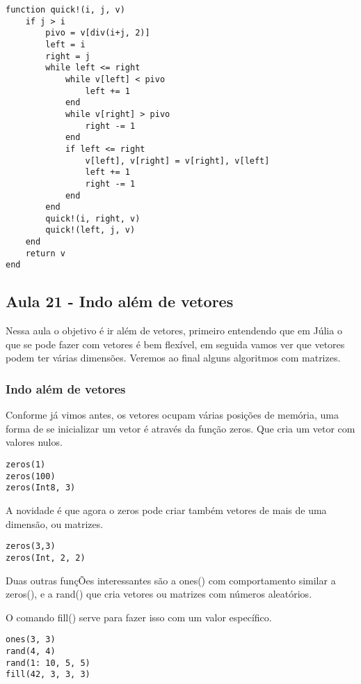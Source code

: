 \documentclass[a4paper]{article}
\begin{document}
\lstset{language=ein-julia,label= ,caption= ,captionpos=b,numbers=none}
\begin{lstlisting}
function quick!(i, j, v)
    if j > i
        pivo = v[div(i+j, 2)]
        left = i
        right = j
        while left <= right
            while v[left] < pivo
                left += 1
            end
            while v[right] > pivo
                right -= 1
            end
            if left <= right
                v[left], v[right] = v[right], v[left]
                left += 1
                right -= 1
            end
        end
        quick!(i, right, v)
        quick!(left, j, v)
    end
    return v
end
\end{lstlisting}
\newpage
\subsection{Aula 21 - Indo além de vetores}
\label{sec:org61260c0}
Nessa aula o objetivo é ir além de vetores, primeiro entendendo que em
Júlia o que se pode fazer com vetores é bem flexível, em seguida vamos
ver que vetores podem ter várias dimensões. Veremos ao final alguns algoritmos
com matrizes.

\subsubsection{Indo além de vetores}
\label{sec:orgedfa311}
Conforme já vimos antes, os vetores ocupam várias posições de
memória, uma forma de se inicializar um vetor é através da função
zeros. Que cria um vetor com valores nulos.

\lstset{language=ein-julia,label= ,caption= ,captionpos=b,numbers=none}
\begin{lstlisting}
zeros(1)
zeros(100)
zeros(Int8, 3)
\end{lstlisting}

A novidade é que agora o zeros pode criar também vetores de mais
de uma dimensão, ou matrizes.
\lstset{language=ein-julia,label= ,caption= ,captionpos=b,numbers=none}
\begin{lstlisting}
zeros(3,3)
zeros(Int, 2, 2)
\end{lstlisting}

Duas outras funçÕes interessantes são a ones() com comportamento
similar a zeros(), e a rand() que cria vetores ou matrizes com
números aleatórios.

O comando fill() serve para fazer isso com um valor específico.
\lstset{language=ein-julia,label= ,caption= ,captionpos=b,numbers=none}
\begin{lstlisting}
ones(3, 3)
rand(4, 4)
rand(1: 10, 5, 5)
fill(42, 3, 3, 3)
\end{lstlisting}
\end{document}
